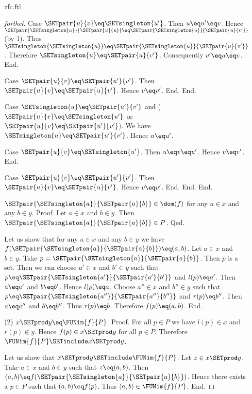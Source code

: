 \documentclass{naproche-library}
\begin{document}
\begin{smodule}[title=ZFC]{zfc.ftl}
\begin{proof}[forthel]
      Case $\SETpair{u}{v} \eq \SETsingleton{u'}$.
        Then $u \eq u'\eq v$.
        Hence $\SETpair{\SETsingleton{u}}{\SETpair{u}{u}} \eq \SETpair{\SETsingleton{u}}{\SETpair{u}{v'}}$ (by 1).
        Thus $\SETsingleton{\SETsingleton{u}} \eq \SETpair{\SETsingleton{u}}{\SETpair{u}{v'}}$.
        Therefore $\SETsingleton{u} \eq \SETpair{u}{v'}$.
        Consequently $v' \eq u \eq v$.
      End.

      Case $\SETpair{u}{v} \eq \SETpair{u'}{v'}$.
        Then $\SETpair{u}{v} \eq \SETpair{u}{v'}$.
        Hence $v \eq v'$.
      End.
    End.

    Case $\SETsingleton{u} \eq \SETpair{u'}{v'}$ and ($\SETpair{u}{v} \eq \SETsingleton{u'}$ or $\SETpair{u}{v} \eq \SETpair{u'}{v'}$).
      We have $\SETsingleton{u} \eq \SETpair{u'}{v'}$.
      Hence $u \eq u'$.

      Case $\SETpair{u}{v} \eq \SETsingleton{u'}$.
        Then $u \eq v \eq u'$.
        Hence $v \eq v'$.
      End.

      Case $\SETpair{u}{v} \eq \SETpair{u'}{v'}$.
        Then $\SETpair{u}{v} \eq \SETpair{u}{v'}$.
        Hence $v \eq v'$.
      End.
    End.
  End.

  $\SETpair{\SETsingleton{a}}{\SETpair{a}{b}} \in \dom(f)$ for any $a \in x$ and any $b \in y$. \newline %
  Proof.
    Let $a \in x$ and $b \in y$.
    Then $\SETpair{\SETsingleton{a}}{\SETpair{a}{b}} \in P$.
  Qed.

  Let us show that for any $a \in x$ and any $b \in y$ we have $f(\SETpair{\SETsingleton{a}}{\SETpair{a}{b}}) \eq (a,b)$.
    Let $a \in x$ and $b \in y$.
    Take $p = \SETpair{\SETsingleton{a}}{\SETpair{a}{b}}$.
    Then $p$ is a set.
    Then we can choose $a' \in x$ and $b' \in y$ such that $p \eq \SETpair{\SETsingleton{a'}}{\SETpair{a'}{b'}}$ and $l(p) \eq a'$.
    Then $a \eq a'$ and $b \eq b'$.
    Hence $l(p) \eq a$.
    Choose $a'' \in x$ and $b'' \in y$ such that $p \eq \SETpair{\SETsingleton{a''}}{\SETpair{a''}{b''}}$ and $r(p) \eq b''$.
    Then $a \eq a''$ and $b \eq b''$.
    Thus $r(p) \eq b$.
    Therefore $f(p) \eq (a,b)$.
  End.

  (2) $x \SETprod y \eq \FUNim{f}{P}$. \newline
  Proof.
    For all $p \in P$ we have $l(p) \in x$ and $r(p) \in y$.
    Hence $f(p) \in x \SETprod y$ for all $p \in P$.
    Therefore $\FUNim{f}{P} \SETinclude x \SETprod y$.

    Let us show that $x \SETprod y \SETinclude \FUNim{f}{P}$.
      Let $z \in x \SETprod y$.
      Take $a \in x$ and $b \in y$ such that $z \eq (a,b)$.
      Then $(a,b) \eq f(\SETpair{\SETsingleton{a}}{\SETpair{a}{b}})$.
      Hence there exists a $p \in P$ such that $(a,b) \eq f(p)$.
      Thus $(a,b) \in \FUNim{f}{P}$.
    End.


\end{proof}
\end{smodule}
\end{document}
